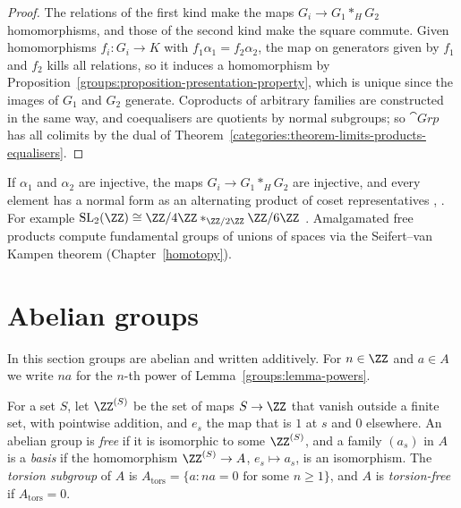 \begin{proof}
The relations of the first kind make the maps $G_i \to G_1 *_H G_2$ homomorphisms, and
those of the second kind make the square commute. Given homomorphisms
$f_i \colon G_i \to K$ with $f_1\alpha_1 = f_2\alpha_2$, the map on generators given by $f_1$
and $f_2$ kills all relations, so it induces a homomorphism by
Proposition~\ref{groups:proposition-presentation-property}, which is unique since the
images of $G_1$ and $G_2$ generate. Coproducts of arbitrary families are
constructed in the same way, and coequalisers are quotients by normal subgroups;
so $\cat{Grp}$ has all colimits by the dual of
Theorem~\ref{categories:theorem-limits-products-equalisers}.
\end{proof}

\begin{remark}\label{groups:remark-normal-form}
If $\alpha_1$ and $\alpha_2$ are injective, the maps $G_i \to G_1 *_H G_2$ are injective,
and every element has a normal form as an alternating product of coset
representatives \cite[Chapter I, Theorem 1]{serre-trees},
\cite[Chapter IV]{lyndon-schupp}. For example
$\mathrm{SL}_2(\ZZ) \cong \ZZ/4\ZZ *_{\ZZ/2\ZZ} \ZZ/6\ZZ$ \cite[Chapter I, \S 4]{serre-trees}.
Amalgamated free products compute fundamental groups of unions of spaces via the
Seifert--van Kampen theorem (Chapter~\ref{homotopy}).
\end{remark}

\section{Abelian groups}\label{groups:section-abelian}

In this section groups are abelian and written additively. For $n \in \ZZ$ and
$a \in A$ we write $na$ for the $n$-th power of Lemma~\ref{groups:lemma-powers}.

\begin{definition}\label{groups:definition-free-abelian}
For a set $S$, let $\ZZ^{(S)}$ be the set of maps $S \to \ZZ$ that vanish outside a
finite set, with pointwise addition, and $e_s$ the map that is $1$ at $s$ and $0$
elsewhere. An abelian group is \emph{free} if it is isomorphic to some $\ZZ^{(S)}$,
and a family $(a_s)$ in $A$ is a \emph{basis} if the homomorphism
$\ZZ^{(S)} \to A$, $e_s \mapsto a_s$, is an isomorphism. The \emph{torsion subgroup} of $A$
is $A_{\mathrm{tors}} = \{a : na = 0 \text{ for some } n \geq 1\}$, and $A$ is
\emph{torsion-free} if $A_{\mathrm{tors}} = 0$.
\end{definition}


